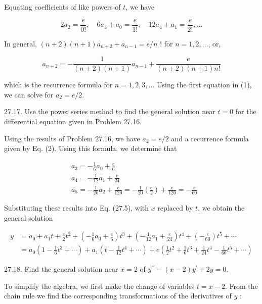 \documentclass[10pt]{article}
\begin{document}
Equating coefficients of like powers of $t$, we have


\begin{equation*}
2 a_{2}=\frac{e}{0 !}, \quad 6 a_{3}+a_{0}=\frac{e}{1 !}, \quad 12 a_{4}+a_{1}=\frac{e}{2 !}, \ldots \tag{1}
\end{equation*}


In general, $(n+2)(n+1) a_{n+2}+a_{n-1}=e / n$ ! for $n=1,2, \ldots$, or,


\begin{equation*}
a_{n+2}=-\frac{1}{(n+2)(n+1)} a_{n-1}+\frac{e}{(n+2)(n+1) n !} \tag{2}
\end{equation*}


which is the recurrence formula for $n=1,2,3, \ldots$ Using the first equation in (1), we can solve for $a_{2}=e / 2$.

27.17. Use the power series method to find the general solution near $t=0$ for the differential equation given in Problem 27.16.

Using the results of Problem 27.16, we have $a_{2}=e / 2$ and a recurrence formula given by Eq. (2). Using this formula, we determine that

$$
\begin{aligned}
& a_{3}=-\frac{1}{6} a_{0}+\frac{e}{6} \\
& a_{4}=-\frac{1}{12} a_{1}+\frac{e}{24} \\
& a_{5}=-\frac{1}{20} a_{2}+\frac{e}{120}=-\frac{1}{20}\left(\frac{e}{2}\right)+\frac{e}{120}=-\frac{e}{60}
\end{aligned}
$$

Substituting these results into Eq. (27.5), with $x$ replaced by $t$, we obtain the general solution

$$
\begin{aligned}
y & =a_{0}+a_{1} t+\frac{e}{2} t^{2}+\left(-\frac{1}{6} a_{0}+\frac{e}{6}\right) t^{3}+\left(-\frac{1}{12} a_{1}+\frac{e}{24}\right) t^{4}+\left(-\frac{e}{60}\right) t^{5}+\cdots \\
& =a_{0}\left(1-\frac{1}{6} t^{3}+\cdots\right)+a_{1}\left(t-\frac{1}{12} t^{4}+\cdots\right)+e\left(\frac{1}{2} t^{2}+\frac{1}{6} t^{3}+\frac{1}{24} t^{4}-\frac{1}{60} t^{5}+\cdots\right)
\end{aligned}
$$

27.18. Find the general solution near $x=2$ of $y^{\prime \prime}-(x-2) y^{\prime}+2 y=0$.

To simplify the algebra, we first make the change of variables $t=x-2$. From the chain rule we find the corresponding transformations of the derivatives of $y$ :
\end{document}
